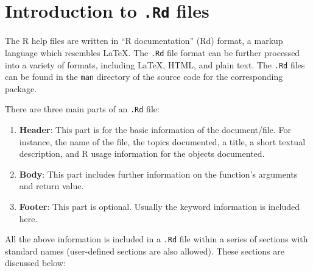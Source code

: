 \documentclass[
]{book}
\begin{document}
\section{\texorpdfstring{Introduction to \texttt{.Rd} files}{Introduction to .Rd files}}\label{introduction-to-.rd-files}

The R help files are written in ``R documentation'' (Rd) format, a markup language which resembles LaTeX. The \texttt{.Rd} file format can be further processed into a variety of formats, including LaTeX, HTML, and plain text. The \texttt{.Rd} files can be found in the \texttt{man} directory of the source code for the corresponding package.

There are three main parts of an \texttt{.Rd} file:

\begin{enumerate}
\def\labelenumi{\arabic{enumi}.}
\item
  \textbf{Header}: This part is for the basic information of the document/file. For instance, the name of the file, the topics documented, a title, a short textual description, and R usage information for the objects documented.
\item
  \textbf{Body}: This part includes further information on the function's arguments and return value.
\item
  \textbf{Footer}: This part is optional. Usually the keyword information is included here.
\end{enumerate}

All the above information is included in a \texttt{.Rd} file within a series of sections with standard names (user-defined sections are also allowed). These sections are discussed below:
\end{document}
